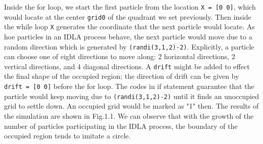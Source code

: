 \documentclass[letterpaper]{article}
\numberwithin{equation}{section} %
\numberwithin{figure}{section} %
\numberwithin{table}{section} %
\begin{document}
\noindent
Inside the for loop, we start the first particle from the location \texttt{X = [0 0]}, which would locate at the center \texttt{grid0} of the quadrant we set previously. Then inside the while loop \texttt{X} generates the coordinate that the next particle would locate. As hoe particles in an IDLA process behave, the next particle would move due to a random direction which is generated by \texttt{(randi(3,1,2)-2)}. Explicitly, a particle can choose one of eight directions to move along: 2 horizontal directions, 2 vertical directions, and 4 diagonal directions. A \texttt{drift} might be added to effect the final shape of the occupied region; the direction of drift can be given by \texttt{drift = [0 0]} before the for loop. The codes in if statement guarantee that the particle would keep moving due to \texttt{(randi(3,1,2)-2)} until it finds an unoccupied grid to settle down. An occupied grid would be marked as "1" then. The results of the simulation are shown in Fig.1.1. We can observe that with the growth of the number of particles participating in the IDLA process, the boundary of the occupied region tends to imitate a circle.
\end{document}
